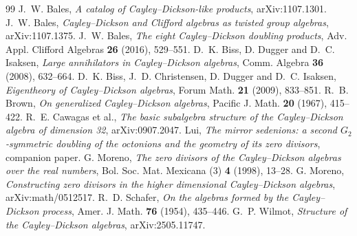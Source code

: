 \documentclass[11pt]{amsart}
\theoremstyle{plain}
\theoremstyle{definition}
\begin{document}
\begin{thebibliography}{99}
 J.~W. Bales, \emph{A catalog of Cayley--Dickson-like products}, arXiv:1107.1301.
 J.~W. Bales, \emph{Cayley--Dickson and Clifford algebras as twisted group algebras}, arXiv:1107.1375.
 J.~W. Bales, \emph{The eight Cayley--Dickson doubling products}, Adv. Appl. Clifford Algebras \textbf{26} (2016), 529--551.
 D.~K. Biss, D. Dugger and D.~C. Isaksen, \emph{Large annihilators in Cayley--Dickson algebras}, Comm. Algebra \textbf{36} (2008), 632--664.
 D.~K. Biss, J.~D. Christensen, D. Dugger and D.~C. Isaksen, \emph{Eigentheory of Cayley--Dickson algebras}, Forum Math. \textbf{21} (2009), 833--851.
 R.~B. Brown, \emph{On generalized Cayley--Dickson algebras}, Pacific J. Math. \textbf{20} (1967), 415--422.
 R.~E. Cawagas et al., \emph{The basic subalgebra structure of the Cayley--Dickson algebra of dimension 32}, arXiv:0907.2047.
 Lui, \emph{The mirror sedenions: a second $G_2$-symmetric doubling of the octonions and the geometry of its zero divisors}, companion paper.
 G. Moreno, \emph{The zero divisors of the Cayley--Dickson algebras over the real numbers}, Bol. Soc. Mat. Mexicana (3) \textbf{4} (1998), 13--28.
 G. Moreno, \emph{Constructing zero divisors in the higher dimensional Cayley--Dickson algebras}, arXiv:math/0512517.
 R.~D. Schafer, \emph{On the algebras formed by the Cayley--Dickson process}, Amer. J. Math. \textbf{76} (1954), 435--446.
 G.~P. Wilmot, \emph{Structure of the Cayley--Dickson algebras}, arXiv:2505.11747.
\end{thebibliography}
\end{document}
